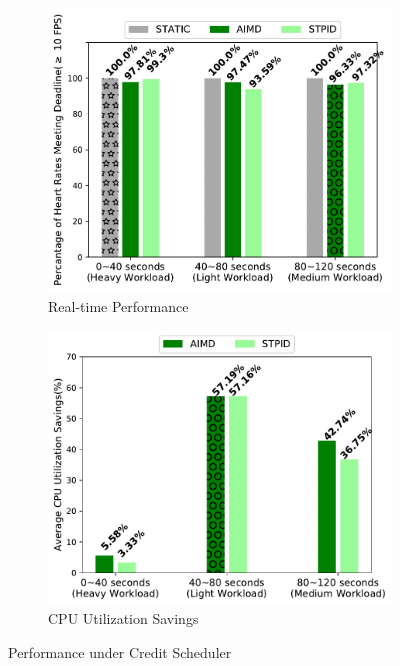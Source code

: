 \begin{figure}[t!]
\centering
\begin{subfigure}{.45\textwidth}
    \centering
    \includegraphics[width=1\linewidth]{images/1vm_credit_fps}
    \caption{Real-time Performance}
    \label{1vm_credit_fps}
\end{subfigure}
\begin{subfigure}{.45\textwidth}
    \centering
    \includegraphics[width=1\linewidth]{images/1vm_credit_cpu}
    \caption{CPU Utilization Savings}
    \label{1vm_credit_cpu}
\end{subfigure}%



\captionsetup{justification=centering}
\caption{Performance under Credit Scheduler}
\label{1vm_credit}
\end{figure}








